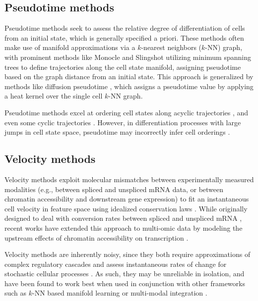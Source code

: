 \subsection{Pseudotime methods}
Pseudotime methods seek to assess the relative degree of differentiation of cells from an initial state, which is generally specified a priori. These methods often make use of manifold approximations via a $k$-nearest neighbors ($k$-NN) graph, with prominent methods like Monocle \citep{trapnellDynamicsRegulatorsCell2014} and Slingshot \citep{streetSlingshotCellLineage2018} utilizing minimum spanning trees to define trajectories along the cell state manifold, assigning pseudotime based on the graph distance from an initial state. This approach is generalized by methods like diffusion pseudotime \citep{haghverdiDiffusionPseudotimeRobustly2016}, which assigns a pseudotime value by applying a heat kernel over the single cell $k$-NN graph.

Pseudotime methods excel at ordering cell states along acyclic trajectories \citep{weinrebLineageTracingTranscriptional2020}, and even some cyclic trajectories \citep{stallaertStructureHumanCell2022}. However, in differentiation processes with large jumps in cell state space, pseudotime may incorrectly infer cell orderings \citep{hudsonTechnologyMeetsTILs2022}.

\subsection{Velocity methods}
Velocity methods exploit molecular mismatches between experimentally measured modalities (e.g., between spliced and unspliced mRNA data, or between chromatin accessibility and downstream gene expression) to fit an instantaneous cell velocity in feature space using idealized conservation laws \citep{lamannoRNAVelocitySingle2018, bergenGeneralizingRNAVelocity2020, chenDeepVeloSinglecellTranscriptomic2022}. While originally designed to deal with conversion rates between spliced and unspliced mRNA \citep{lamannoRNAVelocitySingle2018}, recent works have extended this approach to multi-omic data by modeling the upstream effects of chromatin accessibility on transcription \citep{liMultiomicSinglecellVelocity2023}.

Velocity methods are inherently noisy, since they both require approximations of complex regulatory cascades and assess instantaneous rates of change for stochastic cellular processes \citep{gorinRNAVelocityUnraveled2022}. As such, they may be unreliable in isolation, and have been found to work best when used in conjunction with other frameworks such as $k$-NN based manifold learning or multi-modal integration \citep{ranekIntegratingTemporalSinglecell2022, langeCellRankDirectedSinglecell2022}.

